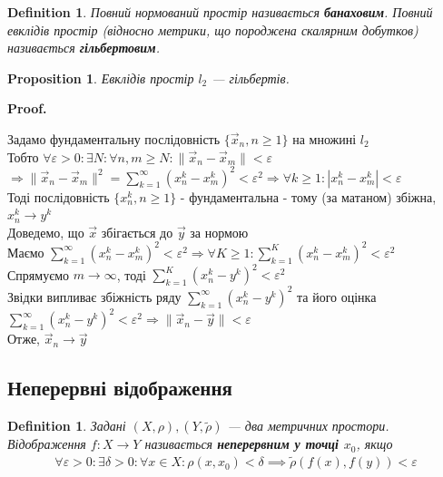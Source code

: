 \documentclass[a4paper, 10pt]{article}
\makeatletter
\theoremstyle{theoremdd}
\theoremstyle{theoremdd}
\newtheorem{definition}[theorem]{Definition}
\theoremstyle{theoremdd}
\theoremstyle{theoremdd}
\theoremstyle{theoremdd}
\newtheorem{proposition}[theorem]{Proposition}
\theoremstyle{theoremdd}
\theoremstyle{theoremdd}
\theoremstyle{theoremdd}
\renewenvironment{proof}[1][Proof.\\]{\par
\pushQED{\hfill \qed}%
\normalfont \topsep6\p@\@plus6\p@\relax
\trivlist
\item\relax
{\bfseries
#1\@addpunct{.}}\hspace\labelsep\ignorespaces
}{%
\popQED\endtrivlist\@endpefalse
}
\makeatother
\begin{document}
\begin{definition}
Повний нормований простір називається \textbf{банаховим}. Повний евклідів простір (відносно метрики, що породжена скалярним добутков) називається \textbf{гільбертовим}.
\end{definition}

\begin{proposition}
Евклідів простір $l_2$ --- гільбертів.
\end{proposition}

\begin{proof}
Задамо фундаментальну послідовність $\{\vec{x}_n, n \geq 1\}$ на множині $l_2$\\
Тобто $\forall \varepsilon > 0: \exists N: \forall n, m \geq N: \|\vec{x}_n - \vec{x}_m\| < \varepsilon$\\
$\Rightarrow \|\vec{x}_n - \vec{x}_m\|^2 = \displaystyle\sum_{k=1}^\infty (x_n^k - x_m^k)^2 < \varepsilon^2 \Rightarrow \forall k \geq 1: |x_n^k - x_m^k| < \varepsilon$\\
Тоді послідовність $\{x_n^k, n \geq 1\}$ - фундаментальна - тому (за матаном) збіжна, $x_n^k \to y^k$\\
Доведемо, що $\vec{x}$ збігається до $\vec{y}$ за нормою\\
Маємо $\displaystyle\sum_{k=1}^\infty (x_n^k - x_m^k)^2 < \varepsilon^2 \Rightarrow \forall K \geq 1: \displaystyle\sum_{k=1}^K (x_n^k - x_m^k)^2 < \varepsilon^2$\\
Спрямуємо $m \to \infty$, тоді $\displaystyle\sum_{k=1}^K (x_n^k - y^k)^2 < \varepsilon^2$\\
Звідки випливає збіжність ряду $\displaystyle\sum_{k=1}^\infty (x_n^k - y^k)^2$ та його оцінка\\
$\displaystyle\sum_{k=1}^\infty (x_n^k - y^k)^2 < \varepsilon^2 \Rightarrow \|\vec{x}_n - \vec{y}\| < \varepsilon$\\
Отже, $\vec{x}_n \to \vec{y}$
\end{proof}

\subsection{Неперервні відображення}
\begin{definition}
Задані $(X,\rho), (Y,\tilde{\rho})$ --- два метричних простори.\\
Відображення $f \colon X \to Y$ називається \textbf{неперервним у точці $x_0$}, якщо
\begin{align*}
\forall \varepsilon > 0: \exists \delta > 0: \forall x \in X: \rho(x,x_0) < \delta \implies \tilde{\rho}(f(x),f(y)) < \varepsilon
\end{align*}
\end{definition}
\end{document}
